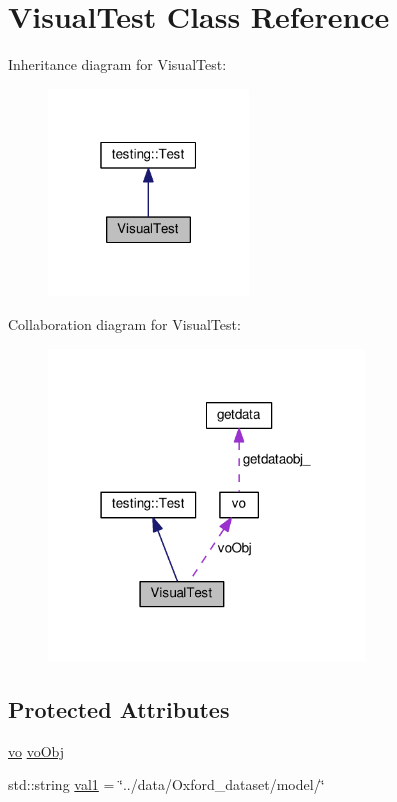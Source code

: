 \hypertarget{class_visual_test}{}\section{Visual\+Test Class Reference}
\label{class_visual_test}


Inheritance diagram for Visual\+Test\+:
\nopagebreak
\begin{figure}[H]
\begin{center}
\leavevmode
\includegraphics[width=151pt]{class_visual_test__inherit__graph}
\end{center}
\end{figure}


Collaboration diagram for Visual\+Test\+:
\nopagebreak
\begin{figure}[H]
\begin{center}
\leavevmode
\includegraphics[width=238pt]{class_visual_test__coll__graph}
\end{center}
\end{figure}
\subsection*{Protected Attributes}
\begin{DoxyCompactItemize}
\item 
\hyperlink{classvo}{vo} \hyperlink{class_visual_test_ada2ac3c1ec41626761106d66c768ee19}{vo\+Obj}
\item 
std\+::string \hyperlink{class_visual_test_add48da25b6995fd1442424f779a777d1}{val1} = \char`\"{}../data/Oxford\+\_\+dataset/model/\char`\"{}
\end{DoxyCompactItemize}
